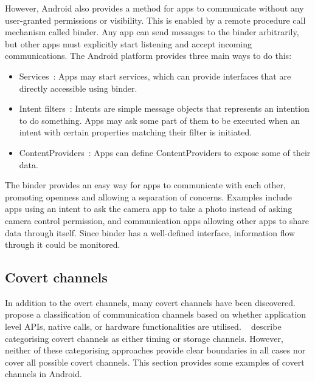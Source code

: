 \documentclass[article]{aaltoseries}
\renewcommand\Gls\cGls
\begin{document}
However, Android also provides a method for apps to communicate without any user-granted permissions or visibility. This is enabled by a remote procedure call mechanism called binder. Any app can send messages to the binder arbitrarily, but other apps must explicitly start listening and accept incoming communications. The Android platform provides three main ways to do this:
\begin{itemize}
	\item Services~\cite[\href{https://developer.android.com/guide/components/services}{``Services overview''}]{AOSPdeveloper}: Apps may start services, which can provide interfaces that are directly accessible using binder.
	\item Intent filters~\cite[\href{https://developer.android.com/guide/components/intents-filters}{``Intents and Intent Filters''}]{AOSPdeveloper}: Intents are simple message objects that represents an intention to do something. Apps may ask some part of them to be executed when an intent with certain properties matching their filter is initiated.
	\item ContentProviders~\cite[\href{https://developer.android.com/guide/topics/providers/content-providers}{``Content providers''}]{AOSPdeveloper}: Apps can define ContentProviders to expose some of their data.
\end{itemize}

The binder provides an easy way for apps to communicate with each other, promoting openness and allowing a separation of concerns. Examples include apps using an intent to ask the camera app to take a photo instead of asking camera control permission, and communication apps allowing other apps to share data through itself. Since binder has a well-defined interface, information flow through it could be monitored.

\subsection{Covert channels}
\label{sec:covert}

In addition to the overt channels, many covert channels have been discovered. \citeauthor{Marforio2012}~\cite{Marforio2012} propose a classification of communication channels based on whether application level APIs, \Gls{os} native calls, or hardware functionalities are utilised. \citeauthor{Al-Haiqi2014}~\cite{Al-Haiqi2014} describe categorising covert channels as either timing or storage channels. However, neither of these categorising approaches provide clear boundaries in all cases nor cover all possible covert channels. This section provides some examples of covert channels in Android.
\end{document}
